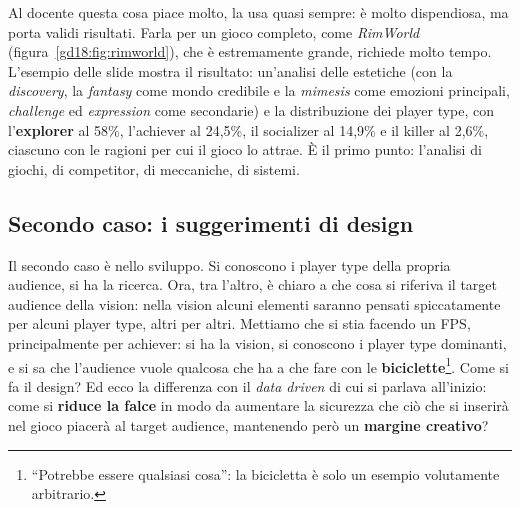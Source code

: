 Al docente questa cosa piace molto, la usa quasi sempre: è molto dispendiosa, ma
porta validi risultati. Farla per un gioco completo, come \emph{RimWorld}
(figura~\ref{gd18:fig:rimworld}), che è estremamente grande, richiede molto tempo.
L'esempio delle slide mostra il risultato: un'analisi delle estetiche (con la
\emph{discovery}, la \emph{fantasy} come mondo credibile e la \emph{mimesis} come
emozioni principali, \emph{challenge} ed \emph{expression} come secondarie) e la
distribuzione dei player type, con l'\textbf{explorer} al 58\%, l'achiever al 24,5\%,
il socializer al 14,9\% e il killer al 2,6\%, ciascuno con le ragioni per cui il gioco
lo attrae. È il primo punto: l'analisi di giochi, di competitor, di meccaniche, di
sistemi.

\subsection{Secondo caso: i suggerimenti di design}


Il secondo caso è nello sviluppo. Si conoscono i player type della propria audience,
si ha la ricerca. Ora, tra l'altro, è chiaro a che cosa si riferiva il target
audience della vision: nella vision alcuni elementi saranno pensati spiccatamente per
alcuni player type, altri per altri. Mettiamo che si stia facendo un FPS,
principalmente per achiever: si ha la vision, si conoscono i player type dominanti, e
si sa che l'audience vuole qualcosa che ha a che fare con le
\textbf{biciclette}\footnote{``Potrebbe essere qualsiasi cosa'': la bicicletta è solo
un esempio volutamente arbitrario.}. Come si fa il design? Ed ecco la differenza con
il \emph{data driven} di cui si parlava all'inizio: come si \textbf{riduce la falce}
in modo da aumentare la sicurezza che ciò che si inserirà nel gioco piacerà al
target audience, mantenendo però un \textbf{margine creativo}?

